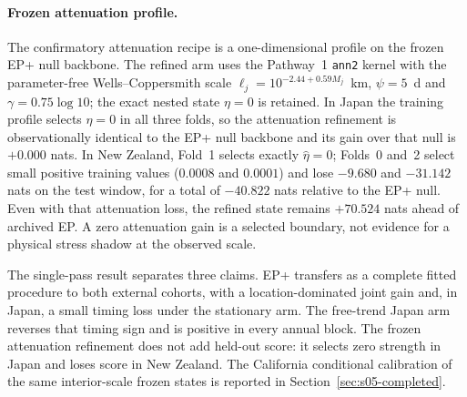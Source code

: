 \paragraph{Frozen attenuation profile.}
The confirmatory attenuation recipe is a one-dimensional profile on the frozen EP+ null backbone. The refined arm uses the Pathway~1 \texttt{ann2} kernel with the parameter-free Wells--Coppersmith scale $\ell_j=10^{-2.44+0.59M_j}$~km, $\psi=5$~d and $\gamma=0.75\log 10$; the exact nested state $\eta=0$ is retained. In Japan the training profile selects $\hat\eta=0$ in all three folds, so the attenuation refinement is observationally identical to the EP+ null backbone and its gain over that null is $+0.000$ nats. In New Zealand, Fold~1 selects exactly $\hat\eta=0$; Folds~0 and~2 select small positive training values ($0.0008$ and $0.0001$) and lose $-9.680$ and $-31.142$ nats on the test window, for a total of $-40.822$ nats relative to the EP+ null. Even with that attenuation loss, the refined state remains $+70.524$ nats ahead of archived EP. A zero attenuation gain is a selected boundary, not evidence for a physical stress shadow at the observed scale.

\begin{table}[htbp]\centering\scriptsize
{}
\caption{Frozen \texttt{ann2}/Wells--Coppersmith one-dimensional attenuation profile on the EP+ null backbone. The refined test gain is relative to the same backbone without attenuation; the last two columns compare the refined state with archived EP and with the EP+ null. The \texttt{plane\_T0} New Zealand refined-minus-null total is the sum of its three refined test gains.}
\label{tab:pathway4-attenuation}
\end{table}

The single-pass result separates three claims. EP+ transfers as a complete fitted procedure to both external cohorts, with a location-dominated joint gain and, in Japan, a small timing loss under the stationary arm. The free-trend Japan arm reverses that timing sign and is positive in every annual block. The frozen attenuation refinement does not add held-out score: it selects zero strength in Japan and loses score in New Zealand. The California conditional calibration of the same interior-scale frozen states is reported in Section~\ref{sec:s05-completed}.
